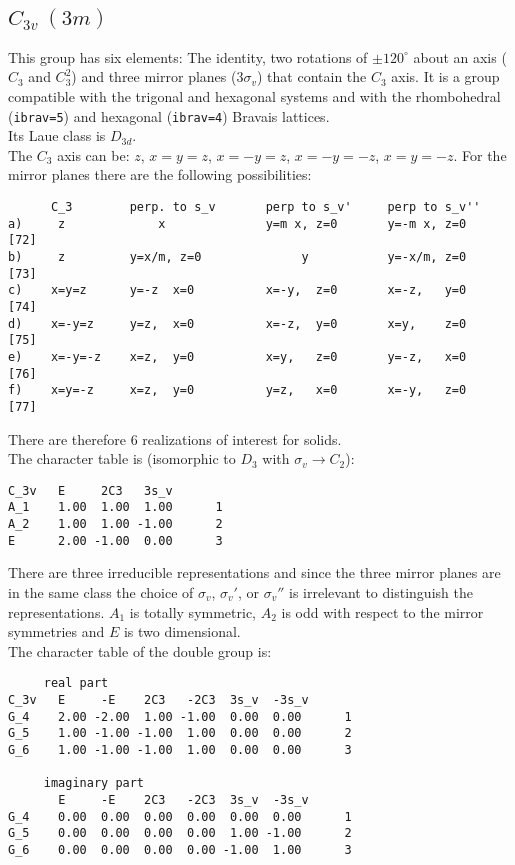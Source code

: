 \documentclass[12pt,a4paper]{article}
\begin{document}
\subsection{\color{web-blue}$C_{3v}\ (3m)$} 
This group has six elements: The identity, two rotations of $\pm120^\circ$ about
an axis ($C_3$ and $C_3^2$) and three mirror planes ($3\sigma_v$) 
that contain the $C_3$ axis.
It is a group compatible with the trigonal and hexagonal systems and with the  
rhombohedral (\texttt{ibrav=5}) and hexagonal (\texttt{ibrav=4}) Bravais lattices. \\ 
Its Laue class is $D_{3d}$. \\
The $C_3$ axis can be: $z$, $x=y=z$, $x=-y=z$, $x=-y=-z$, $x=y=-z$.
For the mirror planes there are the following possibilities:
\begin{footnotesize}
\begin{verbatim}
      C_3        perp. to s_v       perp to s_v'     perp to s_v''
a)     z             x              y=m x, z=0       y=-m x, z=0     [72]
b)     z         y=x/m, z=0              y           y=-x/m, z=0     [73]
c)    x=y=z      y=-z  x=0          x=-y,  z=0       x=-z,   y=0     [74]
d)    x=-y=z     y=z,  x=0          x=-z,  y=0       x=y,    z=0     [75]
e)    x=-y=-z    x=z,  y=0          x=y,   z=0       y=-z,   x=0     [76]
f)    x=y=-z     x=z,  y=0          y=z,   x=0       x=-y,   z=0     [77]
\end{verbatim}
\end{footnotesize}
There are therefore $6$ realizations of interest for solids. \\
The character table is (isomorphic to $D_3$ with $\sigma_v \rightarrow C_2$):
\begin{verbatim}
C_3v   E     2C3   3s_v
A_1    1.00  1.00  1.00      1
A_2    1.00  1.00 -1.00      2
E      2.00 -1.00  0.00      3
\end{verbatim}
There are three irreducible representations and since the three mirror planes
are in the same class the choice of $\sigma_v$, $\sigma_v'$, or $\sigma_v''$ is
irrelevant to distinguish the representations. $A_1$ is totally symmetric,
$A_2$ is odd with respect to the mirror symmetries and $E$ is two dimensional. \\
The character table of the double group is:
\begin{verbatim}
     real part
C_3v   E     -E    2C3   -2C3  3s_v  -3s_v
G_4    2.00 -2.00  1.00 -1.00  0.00  0.00      1
G_5    1.00 -1.00 -1.00  1.00  0.00  0.00      2
G_6    1.00 -1.00 -1.00  1.00  0.00  0.00      3

     imaginary part
       E     -E    2C3   -2C3  3s_v  -3s_v
G_4    0.00  0.00  0.00  0.00  0.00  0.00      1
G_5    0.00  0.00  0.00  0.00  1.00 -1.00      2
G_6    0.00  0.00  0.00  0.00 -1.00  1.00      3
\end{verbatim}
\end{document}

